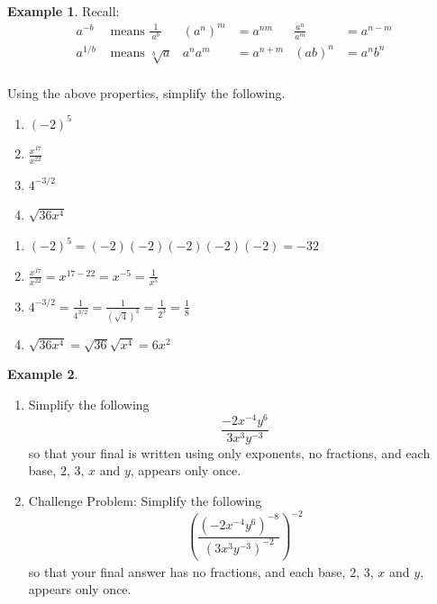 \documentclass[oneside]{book}
\theoremstyle{definition}
\newtheorem{example}{Example}
\theoremstyle{solution}
\newtheorem*{solution}{Solution}
\newcommand{\handoutfill}{}
\newcommand{\handoutitemsep}{}
\newenvironment{solution}{\vspace{2in}\comment}{\endcomment}
\newcommand{\handoutfill}{\vfill}
\newcommand{\handoutitemsep}{\itemsep=\fill}
\begin{document}
\begin{example}
Recall:
\begin{align*}
a^{-b}  & \text{ means }{\frac{1}{\ a^b\ }} & (a^n)^m & = {a^{nm}}   & \frac{a^n}{a^m} & = {a^{n-m}} \\
a^{1/b} & \text{ means }{\sqrt[b]{a}}       & a^n a^m & = {a^{n+m}}   & (ab)^n          & ={a^n b^n} \\
\end{align*}

Using the above properties, simplify the following.
\begin{enumerate}
\handoutitemsep
\item $(-2)^5$
\item $\frac{x^{17}}{x^{22}}$
\item $4^{-3/2}$
\item $\sqrt{36x^4}$
\handoutfill
\end{enumerate}
\end{example}

\begin{solution}
\begin{enumerate}
\item $(-2)^5 = (-2)(-2)(-2)(-2)(-2) = {-32}$
\item $\frac{x^{17}}{x^{22}} = {x^{17-22}=x^{-5}=\frac{1}{x^5}}$
\item $4^{-3/2} = {\frac{1}{4^{3/2}} =
  \frac{1}{(\sqrt{4})^3}=\frac{1}{2^3}=\frac{1}{8}}$
\item $\sqrt{36x^4} = \sqrt{36}\sqrt{x^4} = {6x^2}$
\end{enumerate}
\end{solution}



\begin{example}
\begin{enumerate}
\handoutitemsep
\item Simplify the following
$$
\frac  {-2x^{-4}y^6} 
  {3x^3y^{-3}}
$$
so that your final is written using only exponents, no fractions, and
each base, $2$, $3$, $x$ and $y$, appears only once.

\item  %
Challenge Problem: 
Simplify the following
$$
\left(\frac
  {(-2x^{-4}y^6)^{-8}} 
  {(3x^3y^{-3})^{-2}}
\right)^{-2}_{}
$$
so that your final answer has no fractions, and each base, $2$, $3$,
$x$ and $y$, appears only once. 
\handoutfill
\end{enumerate}
\end{example}
\end{document}
